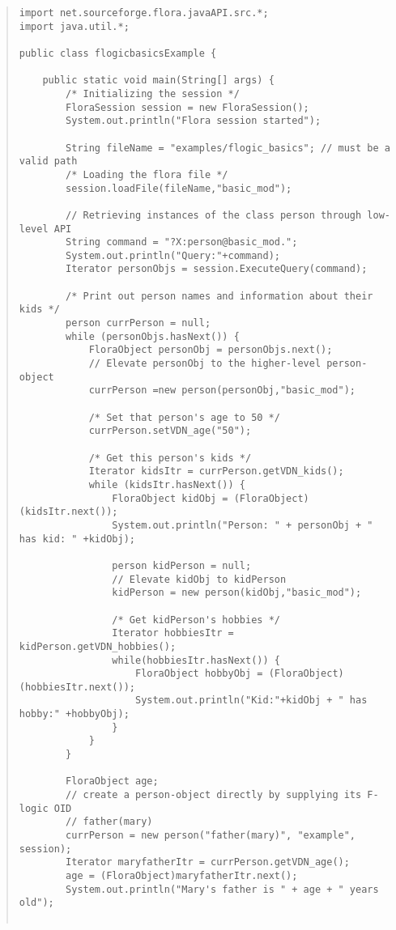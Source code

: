 \begin{quote}
\begin{verbatim}
import net.sourceforge.flora.javaAPI.src.*;
import java.util.*;

public class flogicbasicsExample {

    public static void main(String[] args) {
        /* Initializing the session */
        FloraSession session = new FloraSession();
        System.out.println("Flora session started");

        String fileName = "examples/flogic_basics"; // must be a valid path
        /* Loading the flora file */
        session.loadFile(fileName,"basic_mod");

        // Retrieving instances of the class person through low-level API
        String command = "?X:person@basic_mod.";
        System.out.println("Query:"+command);
        Iterator personObjs = session.ExecuteQuery(command);

        /* Print out person names and information about their kids */
        person currPerson = null;
        while (personObjs.hasNext()) {
            FloraObject personObj = personObjs.next();
            // Elevate personObj to the higher-level person-object
            currPerson =new person(personObj,"basic_mod");

            /* Set that person's age to 50 */
            currPerson.setVDN_age("50");

            /* Get this person's kids */
            Iterator kidsItr = currPerson.getVDN_kids();
            while (kidsItr.hasNext()) {
                FloraObject kidObj = (FloraObject)(kidsItr.next());
                System.out.println("Person: " + personObj + " has kid: " +kidObj);

                person kidPerson = null;
                // Elevate kidObj to kidPerson
                kidPerson = new person(kidObj,"basic_mod");

                /* Get kidPerson's hobbies */
                Iterator hobbiesItr = kidPerson.getVDN_hobbies();
                while(hobbiesItr.hasNext()) {
                    FloraObject hobbyObj = (FloraObject)(hobbiesItr.next());
                    System.out.println("Kid:"+kidObj + " has hobby:" +hobbyObj);
                }
            }
        }

        FloraObject age;
        // create a person-object directly by supplying its F-logic OID
        // father(mary)
        currPerson = new person("father(mary)", "example", session);
        Iterator maryfatherItr = currPerson.getVDN_age();
        age = (FloraObject)maryfatherItr.next();
        System.out.println("Mary's father is " + age + " years old");


\end{verbatim}
\end{quote}
